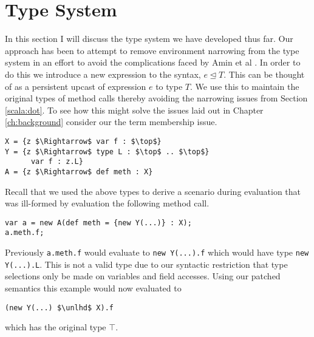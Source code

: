 \documentclass[11pt
              , a4paper
              , twoside
              , openright
              ]{report}
\numberwithin{case}{theorem}
\numberwithin{subcase}{case}
\begin{document}
\section{Type System}
In this section I will discuss the type system we have developed thus far. Our approach has been to attempt to remove environment narrowing from the type system in an effort to avoid the complications faced by Amin et al \cite{amin:fool:2012}. In order to do this we introduce a new expression to the syntax, $e \unlhd T$. This can be thought of as a persistent upcast of expression $e$ to type $T$. We use this to maintain the original types of method calls thereby avoiding the narrowing issues from Section \ref{scala:dot}. To see how this might solve the issues laid out in Chapter \ref{ch:background} consider our the term membership issue.
\begin{lstlisting}[mathescape, style=customlang]
X = {z $\Rightarrow$ var f : $\top$}
Y = {z $\Rightarrow$ type L : $\top$ .. $\top$}
	  var f : z.L}
A = {z $\Rightarrow$ def meth : X}
\end{lstlisting}
Recall that we used the above types to derive a scenario during evaluation that was ill-formed by evaluation the following method call.
\begin{lstlisting}[mathescape, style=customlang]
var a = new A(def meth = {new Y(...)} : X);
a.meth.f;
\end{lstlisting}
Previously \verb|a.meth.f| would evaluate to  \verb|new Y(...).f| which would have type \verb|new Y(...).L|. This is not a valid type due to our syntactic restriction that type selections only be made on variables and field accesses. Using our patched semantics this example would now evaluated to 
\begin{lstlisting}[mathescape, style=customlang]
(new Y(...) $\unlhd$ X).f
\end{lstlisting}
which has the original type $\top$.
\end{document}
